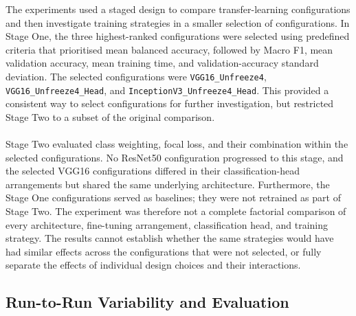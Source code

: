 \documentclass[12pt, a4paper]{report}
\let\oldsubsection\subsection
\renewcommand{\subsection}{%
    \Needspace{6\baselineskip}%
    \oldsubsection
}
\begin{document}
				The experiments used a staged design to compare transfer-learning configurations and then investigate training strategies in a smaller selection of configurations. In Stage One, the three highest-ranked configurations were selected using predefined criteria that prioritised mean balanced accuracy, followed by Macro F1, mean validation accuracy, mean training time, and validation-accuracy standard deviation. The selected configurations were \texttt{VGG16\_Unfreeze4}, \texttt{VGG16\_Unfreeze4\_Head}, and \texttt{InceptionV3\_Unfreeze4\_Head}. This provided a consistent way to select configurations for further investigation, but restricted Stage Two to a subset of the original comparison.\\\\
				Stage Two evaluated class weighting, focal loss, and their combination within the selected configurations. No ResNet50 configuration progressed to this stage, and the selected VGG16 configurations differed in their classification-head arrangements but shared the same underlying architecture. Furthermore, the Stage One configurations served as baselines; they were not retrained as part of Stage Two. The experiment was therefore not a complete factorial comparison of every architecture, fine-tuning arrangement, classification head, and training strategy. The results cannot establish whether the same strategies would have had similar effects across the configurations that were not selected, or fully separate the effects of individual design choices and their interactions.
				
			\subsection{Run-to-Run Variability and Evaluation}
				
\end{document}
